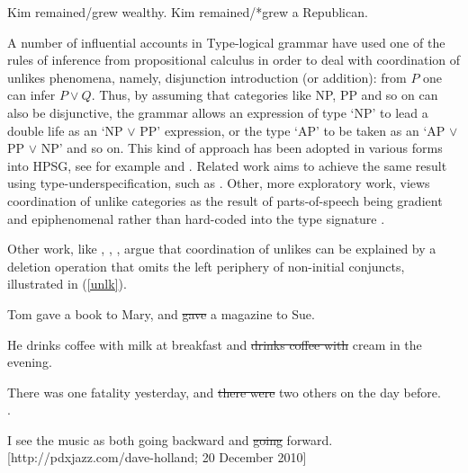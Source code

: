 \documentclass[output=paper
                ,modfonts
                ,nonflat
	        ,collection
	        ,collectionchapter
	        ,collectiontoclongg
 	        ,biblatex
                ,babelshorthands
                ,newtxmath
                ,draftmode
                ,colorlinks, citecolor=brown
]{./langsci/langscibook}
\begin{document}
\begin{exe}
\ex
\begin{xlista}
\ex  Kim remained/grew wealthy.
\ex  Kim remained/*grew a Republican.
\end{xlista}\label{republican}
\end{exe}



\begin{exe}
\ex
\begin{xlista}
\end{xlista}\label{show2}
\end{exe}



A number of influential accounts in Type-logical grammar
\citep{morrill90,morrill94,bayer} have used one of the rules of
inference from propositional calculus in order to deal with
coordination of unlikes phenomena, namely, disjunction introduction
(or addition): from $P$ one can infer $P \vee Q$. 
Thus, by assuming that categories like NP, PP
and so on can also be disjunctive, the grammar allows an expression
of type `NP' to lead a double life as an `NP $\vee$ PP' expression,
or the type `AP' to be taken as an `AP $\vee$ PP $\vee$ NP' and so
on. This kind of approach has been adopted in various forms into HPSG, see for example \citet{Daniels02} and  \citet{Yatabe:04}.
Related work aims to achieve the same result using type-underspecification, such as 
 \citet{sag}. Other, more exploratory work, views coordination of unlike categories as the result of   parts-of-speech being gradient and  epiphenomenal rather than hard-coded into the type signature  \citep{bookivan}. 
 

Other work, like
 \citet{berthold0}, \citet{yatabe},  \citet{Beavers},
 \citet{chaves06}  argue that
coordination of unlikes can be explained by
a deletion operation that omits the left periphery of
non-initial conjuncts, illustrated in   (\ref{unlk}).


\begin{exe}
\ex
\begin{xlista}
\ex Tom gave a book to Mary, and \sout{gave} a magazine to Sue. 

\ex He drinks coffee with milk at breakfast and \sout{drinks coffee with} cream in the evening.\\ \citep{hudson84}

\ex There was one fatality yesterday, and \sout{there were} two others on the day
before.\\
\citep[339]{chavesthesis}.

\ex I see the music as both going backward and \sout{going} forward.\\
{\small [http://pdxjazz.com/dave-holland; 20 December 2010]}
\end{xlista}\label{unlk}
\end{exe}
\end{document}
